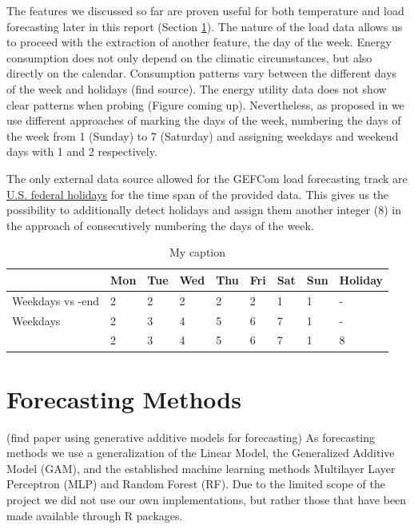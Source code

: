 \documentclass[conference]{IEEEtran}
\begin{document}
The features we discussed so far are proven useful for both temperature and load forecasting later in this report (Section \ref{}). The nature of the load data allows us to proceed with the extraction of another feature, the day of the week. Energy consumption does not only depend on the climatic circumstances, but also directly on the calendar. Consumption patterns vary between the different days of the week and holidays (find source). The energy utility data does not show clear patterns when probing (Figure coming up). Nevertheless, as proposed in \cite{Hyndman2010} we use different approaches of marking the days of the week, numbering the days of the week from 1 (Sunday) to 7 (Saturday) and assigning weekdays and weekend days with 1 and 2 respectively.\par
The only external data source allowed for the GEFCom load forecasting track are \href{http://archive.opm.gov/Operating\_Status\_Schedules/fedhol/2014.asp}{U.S. federal holidays} for the time span of the provided data. This gives us the possibility to additionally detect holidays and assign them another integer (8) in the approach of consecutively numbering the days of the week.

\begin{table}[h]
\centering
\begin{tabular}{@{}lllllllll@{}}
\toprule
 & Mon & Tue & Wed & Thu & Fri & Sat & Sun & Holiday \\ \midrule
Weekdays vs -end & 2 & 2 & 2 & 2 & 2 & 1 & 1 & - \\
Weekdays & 2 & 3 & 4 & 5 & 6 & 7 & 1 & - \\
 & 2 & 3 & 4 & 5 & 6 & 7 & 1 & 8 \\ \bottomrule
\end{tabular}
\caption{My caption}
\label{my-label}
\end{table}

\section{Forecasting Methods}
(find paper using generative additive models for forecasting)
As forecasting methods we use a generalization of the Linear Model, the Generalized Additive Model (GAM), and the established machine learning methods Multilayer Layer Perceptron (MLP) and Random Forest (RF). Due to the limited scope of the project we did not use our own implementations, but rather those that have been made available through R packages.
\end{document}
